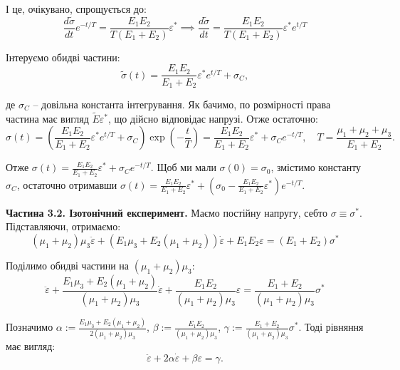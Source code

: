 \documentclass{hw_template}
\begin{document}
І це, очікувано, спрощується до:
\begin{equation*}
    \frac{d\widetilde{\sigma}}{dt}e^{-t/T} = \frac{E_1E_2}{T(E_1+E_2)}\varepsilon^* \implies \frac{d\widetilde{\sigma}}{dt} = \frac{E_1E_2}{T(E_1+E_2)}\varepsilon^*e^{t/T}
\end{equation*}

Інтеруємо обидві частини:
\begin{equation*}
    \widetilde{\sigma}(t) = \frac{E_1E_2}{E_1+E_2}\varepsilon^*e^{t/T} + \sigma_C,
\end{equation*}

де $\sigma_C$ – довільна константа інтегрування. Як бачимо, по розмірності
права частина має вигляд $\widetilde{E}\varepsilon^*$, що дійсно відповідає 
напрузі. Отже остаточно:
\begin{equation*}
    \sigma(t) = \left(\frac{E_1E_2}{E_1+E_2}\varepsilon^*e^{t/T} + \sigma_C\right)\exp\left(-\frac{t}{T}\right) = \frac{E_1E_2}{E_1+E_2}\varepsilon^* + \sigma_Ce^{-t/T}, \quad T = \frac{\mu_1+\mu_2+\mu_3}{E_1+E_2}.
\end{equation*}

Отже $\sigma(t) = \frac{E_1E_2}{E_1+E_2}\varepsilon^* + \sigma_Ce^{-t/T}$. Щоб ми мали $\sigma(0)=\sigma_0$, змістимо константу $\sigma_C$, остаточно 
отримавши \textcolor{blue!90!blue}{$\sigma(t) = \frac{E_1E_2}{E_1+E_2}\varepsilon^* + \left(\sigma_0 - \frac{E_1E_2}{E_1+E_2}\varepsilon^*\right)e^{-t/T}$}.

\textcolor{blue!90!white}{\textbf{Частина 3.2. Ізотонічний експеримент.}} Маємо постійну напругу, себто $\sigma \equiv \sigma^*$. Підставляючи, отримаємо:
\begin{equation*}
    (\mu_1+\mu_2)\mu_3\ddot{\varepsilon} + (E_1\mu_3 + E_2(\mu_1+\mu_2))\dot{\varepsilon} + E_1E_2\varepsilon = (E_1 + E_2)\sigma^*
\end{equation*}

Поділимо обидві частини на $(\mu_1+\mu_2)\mu_3$:
\begin{equation*}
    \ddot{\varepsilon} + \frac{E_1\mu_3 + E_2(\mu_1+\mu_2)}{(\mu_1+\mu_2)\mu_3}\dot{\varepsilon} + \frac{E_1E_2}{(\mu_1+\mu_2)\mu_3}\varepsilon = \frac{E_1 + E_2}{(\mu_1+\mu_2)\mu_3}\sigma^*
\end{equation*}

Позначимо $\alpha := \frac{E_1\mu_3 + E_2(\mu_1+\mu_2)}{2(\mu_1+\mu_2)\mu_3}$, $\beta := \frac{E_1E_2}{(\mu_1+\mu_2)\mu_3}$, $\gamma := \frac{E_1 + E_2}{(\mu_1+\mu_2)\mu_3}\sigma^*$. Тоді рівняння має вигляд:
\begin{equation*}
    \ddot{\varepsilon} + 2\alpha\dot{\varepsilon} + \beta\varepsilon = \gamma.
\end{equation*}
\end{document}
